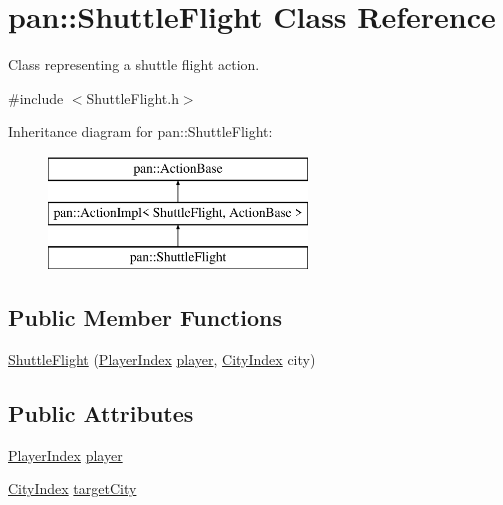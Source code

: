 \hypertarget{classpan_1_1_shuttle_flight}{}\section{pan\+:\+:Shuttle\+Flight Class Reference}
\label{classpan_1_1_shuttle_flight}


Class representing a shuttle flight action.  




{\ttfamily \#include $<$Shuttle\+Flight.\+h$>$}

Inheritance diagram for pan\+:\+:Shuttle\+Flight\+:\begin{figure}[H]
\begin{center}
\leavevmode
\includegraphics[height=3.000000cm]{classpan_1_1_shuttle_flight}
\end{center}
\end{figure}
\subsection*{Public Member Functions}
\begin{DoxyCompactItemize}
\item 
\hyperlink{classpan_1_1_shuttle_flight_af5deefa81bd19d0fd0776a43c045067a}{Shuttle\+Flight} (\hyperlink{namespacepan_a0cdabf874fbf1bb3a1f0152d108c2909}{Player\+Index} \hyperlink{classpan_1_1_shuttle_flight_a50cd09f3860cdfb821d676dd59c09949}{player}, \hyperlink{namespacepan_afaed28aa6603153dcc062a028602d697}{City\+Index} city)
\end{DoxyCompactItemize}
\subsection*{Public Attributes}
\begin{DoxyCompactItemize}
\item 
\hyperlink{namespacepan_a0cdabf874fbf1bb3a1f0152d108c2909}{Player\+Index} \hyperlink{classpan_1_1_shuttle_flight_a50cd09f3860cdfb821d676dd59c09949}{player}
\item 
\hyperlink{namespacepan_afaed28aa6603153dcc062a028602d697}{City\+Index} \hyperlink{classpan_1_1_shuttle_flight_ac32722c319ed43587c2374109c70f734}{target\+City}
\end{DoxyCompactItemize}


